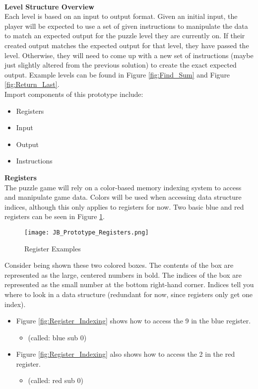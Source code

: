 \\
\textbf{Level Structure Overview}\\

Each level is based on an input to output format. Given an initial input, the player
will be expected to use a set of given instructions to manipulate the data to
match an expected output for the puzzle level they are currently on. If their
created output matches the expected output for that level, they have passed the level.
Otherwise, they will need to come up with a new set of instructions (maybe just
slightly altered from the previous solution) to create the exact expected output.
Example levels can be found in Figure \ref{fig:Find_Sum} and Figure \ref{fig:Return_Last}.\\

Import components of this prototype include:
\begin{itemize}
  \item Registers
  \item Input
  \item Output
  \item Instructions
\end{itemize}

\textbf{Registers}\\

The puzzle game will rely on a color-based memory indexing system to access and
manipulate game data. Colors will be used when accessing data structure indices,
although this only applies to registers for now. Two basic blue and red registers
can be seen in Figure \ref{fig:Register_Examples}.

\begin{figure}[!hb]
  \caption{Register Examples}
  \label{fig:Register_Examples}
  \centering
  \texttt{[image: JB\_Prototype\_Registers.png]}
\end{figure}

Consider being shown these two colored boxes. The contents of the box are represented
as the large, centered numbers in bold. The indices of the box are represented as the
small number at the bottom right-hand corner. Indices tell you where to look in a
data structure (redundant for now, since registers only get one index).

\begin{itemize}
  \item Figure \ref{fig:Register_Indexing} shows how to access the 9 in the blue register.
  \begin{itemize}
    \item (called: blue sub 0)
  \end{itemize}
  \item Figure \ref{fig:Register_Indexing} also shows how to access the 2 in the red register.
  \begin{itemize}
    \item (called: red sub 0)
  \end{itemize}
\end{itemize}

